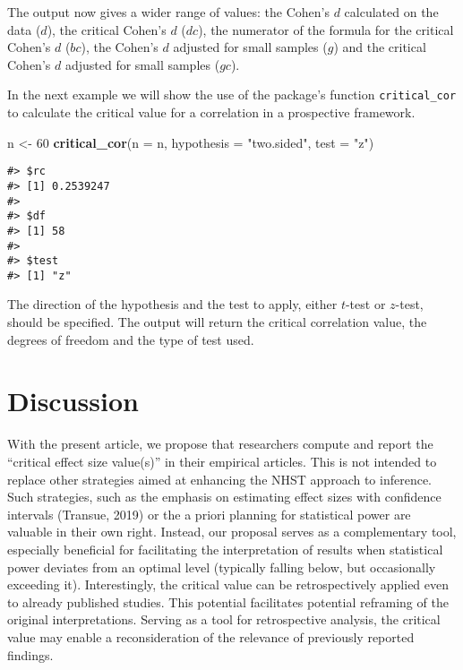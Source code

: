 \documentclass[
  man]{apa7}
\newenvironment{Shaded}{\begin{snugshade}}{\end{snugshade}}
\newcommand{\AttributeTok}[1]{\textcolor[rgb]{0.13,0.29,0.53}{#1}}
\newcommand{\DecValTok}[1]{\textcolor[rgb]{0.00,0.00,0.81}{#1}}
\newcommand{\FunctionTok}[1]{\textcolor[rgb]{0.13,0.29,0.53}{\textbf{#1}}}
\newcommand{\NormalTok}[1]{#1}
\newcommand{\OtherTok}[1]{\textcolor[rgb]{0.56,0.35,0.01}{#1}}
\newcommand{\StringTok}[1]{\textcolor[rgb]{0.31,0.60,0.02}{#1}}
\begin{document}
The output now gives a wider range of values: the Cohen's \(d\) calculated on the data (\(d\)), the critical Cohen's \(d\) (\(dc\)), the numerator of the formula for the critical Cohen's \(d\) (\(bc\)), the Cohen's \(d\) adjusted for small samples (\(g\)) and the critical Cohen's \(d\) adjusted for small samples (\(gc\)).

In the next example we will show the use of the package's function \texttt{critical\_cor} to calculate the critical value for a correlation in a prospective framework.

\begin{Shaded}
\begin{Highlighting}[]
\NormalTok{n }\OtherTok{\textless{}{-}} \DecValTok{60}
\FunctionTok{critical\_cor}\NormalTok{(}\AttributeTok{n =}\NormalTok{ n, }\AttributeTok{hypothesis =} \StringTok{"two.sided"}\NormalTok{, }\AttributeTok{test =} \StringTok{"z"}\NormalTok{)}
\end{Highlighting}
\end{Shaded}

\begin{verbatim}
#> $rc
#> [1] 0.2539247
#> 
#> $df
#> [1] 58
#> 
#> $test
#> [1] "z"
\end{verbatim}

The direction of the hypothesis and the test to apply, either \(t\)-test or \(z\)-test, should be specified. The output will return the critical correlation value, the degrees of freedom and the type of test used.

\hypertarget{discussion}{%
\section{Discussion}\label{discussion}}

With the present article, we propose that researchers compute and report the ``critical effect size value(s)'' in their empirical articles. This is not intended to replace other strategies aimed at enhancing the NHST approach to inference. Such strategies, such as the emphasis on estimating effect sizes with confidence intervals (Transue, 2019) or the a priori planning for statistical power are valuable in their own right. Instead, our proposal serves as a complementary tool, especially beneficial for facilitating the interpretation of results when statistical power deviates from an optimal level (typically falling below, but occasionally exceeding it). Interestingly, the critical value can be retrospectively applied even to already published studies. This potential facilitates potential reframing of the original interpretations. Serving as a tool for retrospective analysis, the critical value may enable a reconsideration of the relevance of previously reported findings.
\end{document}
